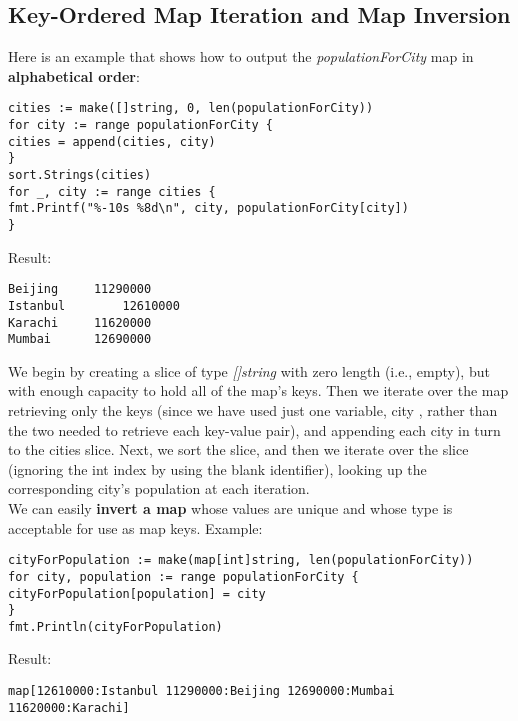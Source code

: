 \documentclass[10pt,letterpaper]{report}
\begin{document}
\subsection{Key-Ordered Map Iteration and Map Inversion}
Here is an example that shows how to output the \textit{populationForCity} map in \textbf{alphabetical order}:
\begin{lstlisting}
cities := make([]string, 0, len(populationForCity))
for city := range populationForCity {
cities = append(cities, city)
}
sort.Strings(cities)
for _, city := range cities {
fmt.Printf("%-10s %8d\n", city, populationForCity[city])
}
\end{lstlisting}
Result:
\begin{lstlisting}
Beijing		11290000
Istanbul		12610000
Karachi		11620000
Mumbai		12690000
\end{lstlisting}
We begin by creating a slice of type \textit{[]string} with zero length (i.e., empty), but with enough capacity to hold all of the map's keys. Then we iterate over the map retrieving only the keys (since we have used just one variable, city , rather than the two needed to retrieve each key-value pair), and appending each city in turn to the cities slice. Next, we sort the slice, and then we iterate over the slice (ignoring the int index by using the blank identifier), looking up the corresponding city's population at each iteration.\\
We can easily \textbf{invert a map} whose values are unique and whose type is acceptable for use as map keys. Example:
\begin{lstlisting}
cityForPopulation := make(map[int]string, len(populationForCity))
for city, population := range populationForCity {
cityForPopulation[population] = city
}
fmt.Println(cityForPopulation)
\end{lstlisting}
Result:
\begin{lstlisting}
map[12610000:Istanbul 11290000:Beijing 12690000:Mumbai 11620000:Karachi]
\end{lstlisting}
\end{document}

